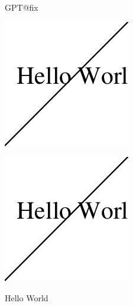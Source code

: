 
\def\Gin@driver{pdftex.def}

\csname GPT@fix\endcsname
\resetatcatcode

\includegraphics[bb=10 10 100 100]{stroke}

\includegraphics{stroke}

Hello World
\bye
